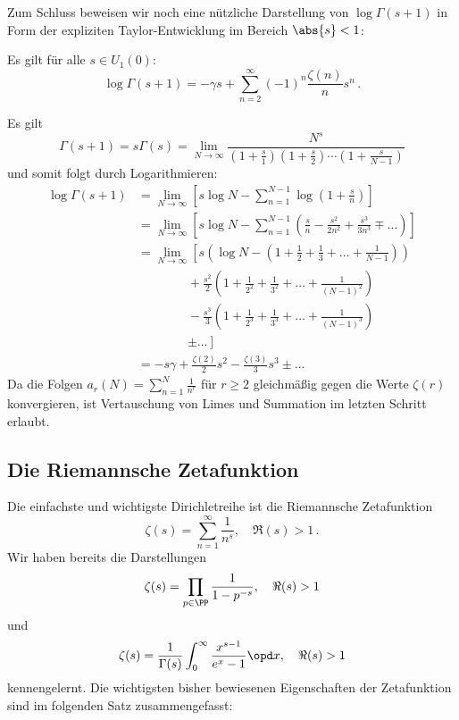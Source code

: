 Zum Schluss beweisen wir noch eine nützliche Darstellung von $\log \Gamma(s+1)$ in Form der expliziten Taylor-Entwicklung im Bereich $\abs{s} < 1$: 

\begin{satz}
Es gilt für alle $s \in U_1(0)$:
\[
	\log \Gamma(s+1) = - \gamma s + \sum_{n=2}^\infty (-1)^n \frac {\zeta(n)}n s^n
	\,.
\]
\end{satz}

\begin{bewe}
Es gilt
\[
	\Gamma(s+1) = s \Gamma(s) = \lim_{N \to \infty} \frac {N^s}{\left( 1 + \frac s1 \right) \left( 1 + \frac s2 \right) \cdots \left( 1 + \frac s{N-1} \right)}
\]
und somit folgt durch Logarithmieren:
\begin{align*}
	\log \Gamma(s+1) 
	&= \lim_{N \to \infty} \left[ s \log N - \sum_{n=1}^{N-1} \log(1 + \frac sn) \right] \\
	&= \lim_{N \to \infty} \left[ s \log N - \sum_{n=1}^{N-1} \left( \frac sn - \frac {s^2}{2n^2} + \frac {s^3}{3n^3} \mp \ldots \right) \right] \\
	&= \lim_{N \to \infty} \left[ s \left( \log N - \left( 1 + \frac 12 + \frac 13 + \ldots + \frac 1{N-1} \right) \right) \right. \\
	&\qquad\qquad + \frac {s^2}2 \left( 1 + \frac 1{2^2} + \frac 1{3^2} + \ldots + \frac 1{(N-1)^2} \right) \\
	&\qquad\qquad - \frac {s^3}3 \left( 1 + \frac 1{2^3} + \frac 1{3^3} + \ldots + \frac 1{(N-1)^3} \right) \\
	&\qquad\qquad \left. \pm \ldots \right] \\
	&= -s\gamma + \frac {\zeta(2)}2 s^2 - \frac {\zeta(3)}3 s^3 \pm \ldots
\end{align*}
Da die Folgen $a_r(N) = \sum_{n=1}^N \frac 1{n^r}$ für $r \geq 2$ gleichmäßig gegen die Werte $\zeta(r)$ konvergieren, ist Vertauschung von Limes und Summation im letzten Schritt erlaubt.
\end{bewe}



\subsection{Die Riemannsche Zetafunktion}

Die einfachste und wichtigste Dirichletreihe ist die Riemannsche Zetafunktion
\[
	\zeta(s) = \sum_{n=1}^\infty \frac 1{n^s}, \quad \Re(s) > 1
	\,.
\]
Wir haben bereits die Darstellungen 
\[
	\zeta(s) = \prod_{p \in \PP} \frac 1{1 - p^{-s}}, \quad \Re(s) > 1
\]
und
\[
	\zeta(s) = \frac 1{\Gamma(s)} \int_0^\infty \frac {x^{s-1}}{e^x - 1} \opd x, \quad \Re(s) > 1
\]
kennengelernt. Die wichtigsten bisher bewiesenen Eigenschaften der Zetafunktion sind im folgenden Satz zusammengefasst:

